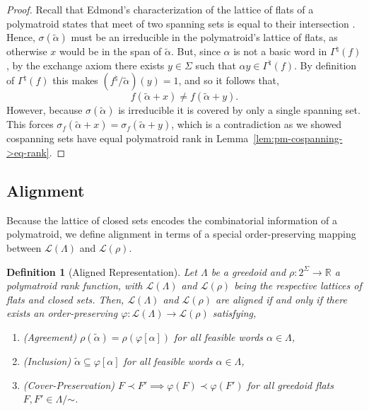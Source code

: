 \documentclass[11pt]{article}
\newtheorem{definition}[theorem]{Definition}
\newcommand{\univ}{\Sigma}
\newcommand{\glang}{\Lambda}
\providecommand{\L}{}
\renewcommand{\L}{\mathscr{L}}
\begin{document}
\begin{proof}
    Recall that Edmond's characterization of the lattice of flats of a polymatroid states that meet of two spanning sets is equal to their intersection \cite{edmonds2003submodular}.
    Hence, $\sigma(\widetilde{\alpha})$ must be an irreducible in the polymatroid's lattice of flats, as otherwise $x$ would be in the span of $\widetilde{\alpha}$.
    But, since $\alpha$ is not a basic word in $\Gamma^\natural(f)$, by the exchange axiom there exists $y \in\univ$ such that $\alpha y\in\Gamma^\natural(f)$.
    By definition of $\Gamma^\natural(f)$ this makes $(f^\natural/\widetilde{\alpha})(y) = 1$, and so it follows that,
    \[
        f(\widetilde{\alpha} + x) \neq f(\widetilde{\alpha} + y).
    \]
    However, because $\sigma(\widetilde{\alpha})$ is irreducible it is covered by only a single spanning set.
    This forces $\sigma_f(\widetilde{\alpha} + x) = \sigma_f(\widetilde{\alpha} + y)$, which is a contradiction as we showed cospanning sets have equal polymatroid rank in Lemma~\ref{lem:pm-cospanning->eq-rank}.
    \fi
\end{proof}
\fi
\subsection{Alignment}\label{subsec:alignment}

Because the lattice of closed sets encodes the combinatorial information of a polymatroid, we define alignment in terms of a special order-preserving mapping between $\L(\glang)$ and $\L(\rho)$.

\begin{definition}[Aligned Representation]\label{def:aligned}
    Let $\glang$ be a greedoid and $\rho:2^\univ\to\mathbb{R}$ a polymatroid rank function, with $\L(\glang)$ and $\L(\rho)$ being the respective lattices of flats and closed sets.
    Then, $\L(\glang)$ and $\L(\rho)$ are \emph{aligned} if and only if there exists an order-preserving $\varphi: \L(\glang) \to \L(\rho)$ satisfying,
    \begin{enumerate}
        \item \emph{(Agreement)} $\rho(\widetilde{\alpha}) = \rho(\varphi[\alpha])$ for all feasible words $\alpha \in \glang$,
        \item \emph{(Inclusion)} $\widetilde{\alpha}\subseteq\varphi[\alpha]$ for all feasible words $\alpha \in \glang$,
        \item \emph{(Cover-Preservation)} $F \prec F' \implies \varphi(F) \prec \varphi(F')$ for all greedoid flats $F, F'\in\glang/\mathord{\sim}$.
    \end{enumerate}
\end{definition}
\end{document}

